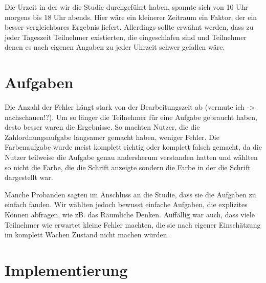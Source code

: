 Die Urzeit in der wir die Studie durchgeführt haben, spannte sich von 10 Uhr morgens bis 18 Uhr abends. Hier wäre ein kleinerer Zeitraum ein Faktor, der ein besser vergleichbares Ergebnis liefert. 
Allerdings sollte erwähnt werden, dass zu jeder Tageszeit Teilnehmer existierten, die eingeschlafen sind und Teilnehmer denen es nach eigenen Angaben zu jeder Uhrzeit schwer gefallen wäre.


\section{Aufgaben}

Die Anzahl der Fehler hängt stark von der Bearbeitungszeit ab (vermute ich -> nachschauen!?). Um so länger die Teilnehmer für eine Aufgabe gebraucht haben, desto besser waren die Ergebnisse. So machten Nutzer, die die Zahlordnungsaufgabe langsamer gemacht haben, weniger Fehler. Die Farbenaufgabe wurde meist komplett richtig oder komplett falsch gemacht, da die Nutzer teilweise die Aufgabe genau andersherum verstanden hatten und wählten so nicht die Farbe, die die Schrift anzeigte sondern die Farbe in der die Schrift dargestellt war.

Manche Probanden sagten im Anschluss an die Studie, dass sie die Aufgaben zu einfach fanden. Wir wählten jedoch bewusst einfache Aufgaben, die explizites Können abfragen, wie zB. das Räumliche Denken. Auffällig war auch, dass viele Teilnehmer wie erwartet kleine Fehler machten, die sie nach eigener Einschätzung im komplett Wachen Zustand nicht machen würden. 


\section{Implementierung}


